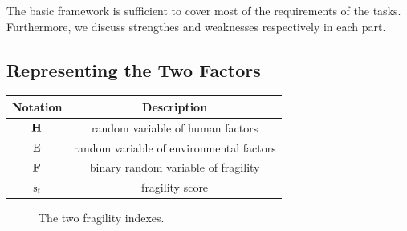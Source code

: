 The basic framework is sufficient to cover most of the requirements of the tasks.
Furthermore, we discuss strengthes and weaknesses respectively in each part.

\subsection{Representing the Two Factors}
\label{sec:model:rep}
\begin{table}[htbp]
   \centering
   \begin{tabular}{|c|c|} \hline 
      Notation & Description \\ \hline
      $\operatorname*{\mathbf{H}} $  & random variable of human factors \\ \hline
      $\operatorname*{E} $ & random variable of environmental factors \\ \hline
      $ \operatorname*{\mathbf{F}} $ & binary random variable of fragility \\ \hline
      $\operatorname*{s_f} $ & fragility score \\ \hline
   \end{tabular}
\end{table}

\begin{figure}[t]
    \centering
    \caption{The two fragility indexes.}
    \label{fig:model:indexes}
\end{figure}

